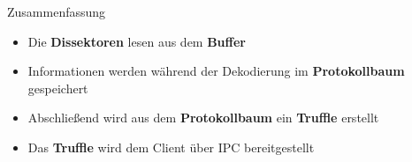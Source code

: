 \begin{frame}{Zusammenfassung}
  \begin{itemize}
      \item Die \textbf{Dissektoren} lesen aus dem \textbf{Buffer}
      \item Informationen werden während der Dekodierung im \textbf{Protokollbaum} gespeichert
      \item Abschließend wird aus dem \textbf{Protokollbaum} ein \textbf{Truffle} erstellt
      \item Das \textbf{Truffle} wird dem Client \"uber IPC bereitgestellt
  \end{itemize}
\end{frame}